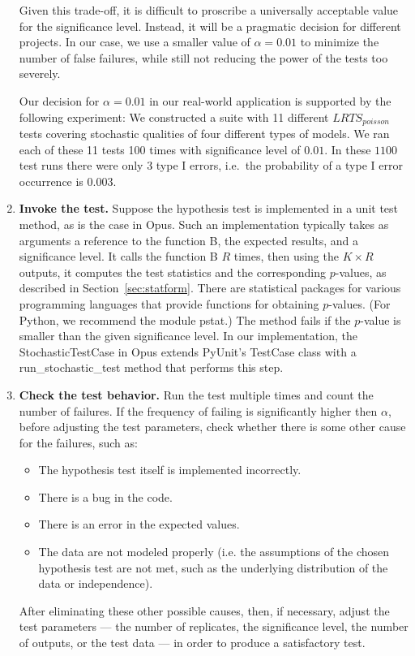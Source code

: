 \documentclass{sig-alternate}
\begin{document}
\begin{enumerate}
Given this trade-off, it is difficult to proscribe a universally acceptable
value for the significance level.  Instead, it will be a pragmatic decision
for different projects.  In our case, we use a smaller value of
$\alpha=0.01$ to minimize the number of false failures, while still not 
reducing the power of the tests too severely.

Our decision for $\alpha=0.01$ in our real-world application is supported by
the following experiment: We constructed a suite with 11 different
$LRTS_{poisson}$ tests covering stochastic qualities of four different types
of models.  We ran each of these 11 tests 100 times with significance level of
$0.01$.  In these $1100$ test runs there were only 3 type I errors, i.e.\ the
probability of a type I error occurrence is $0.003$.

\item
{\bf Invoke the test.}  Suppose the hypothesis test is implemented in a
unit test method, as is the case in Opus. Such an implementation typically
takes as arguments a reference to the function B, the expected results, and
a significance level.  It calls the function B $R$ times, then using the
$K\times R$ outputs, it computes the test statistics and the corresponding
$p$-values, as described in Section~\ref{sec:statform}. There are
statistical packages for various programming languages that provide
functions for obtaining $p$-values.  (For Python, we recommend the module
pstat.) The method fails if the $p$-value is smaller than the given
significance level.  In our implementation, the StochasticTestCase in Opus
extends PyUnit's TestCase class with a run\_stochastic\_test method that
performs this step.

\item
{\bf Check the test behavior.}
Run the test multiple times and count the number of failures. If the frequency
of failing is significantly higher then $\alpha$, before adjusting the test
parameters, check whether there is some other cause for the failures, such as:
\begin{itemize}
\item The hypothesis test itself is implemented incorrectly.
\item There is a bug in the code.
\item There is an error in the expected values.
\item The data are not modeled properly (i.e. the assumptions of the
  chosen hypothesis test are not met, such as the underlying distribution of
  the data or independence). 
\end{itemize}

After eliminating these other possible causes, then, if necessary, adjust the
test parameters --- the number of replicates, the significance level, the
number of outputs, or the test data --- in order to produce a satisfactory
test.

\end{enumerate}
\end{document}
